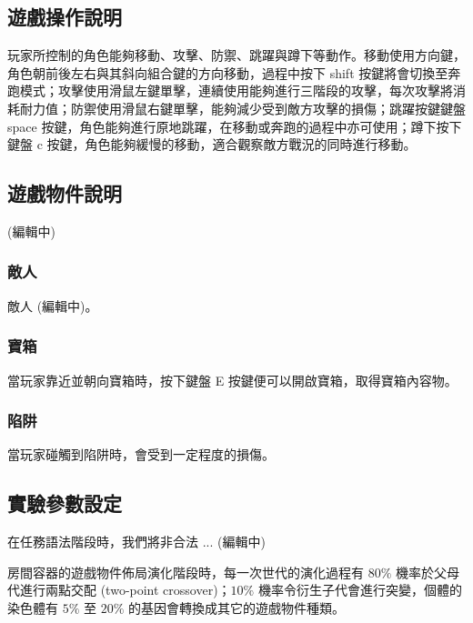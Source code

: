 \subsection{遊戲操作說明}
\label{ssec:experiment-gameplaymanual}

玩家所控制的角色能夠移動、攻擊、防禦、跳躍與蹲下等動作。移動使用方向鍵，角色朝前後左右與其斜向組合鍵的方向移動，過程中按下 shift 按鍵將會切換至奔跑模式；攻擊使用滑鼠左鍵單擊，連續使用能夠進行三階段的攻擊，每次攻擊將消耗耐力值；防禦使用滑鼠右鍵單擊，能夠減少受到敵方攻擊的損傷；跳躍按鍵鍵盤 space 按鍵，角色能夠進行原地跳躍，在移動或奔跑的過程中亦可使用；蹲下按下鍵盤 c 按鍵，角色能夠緩慢的移動，適合觀察敵方戰況的同時進行移動。

\subsection{遊戲物件說明}
\label{ssec:experiment-gameobjects}

(編輯中)

\subsubsection{敵人}
\label{sssec:experiment-gameobjects-enemy}

敵人 (編輯中)。

\subsubsection{寶箱}
\label{sssec:experiment-gameobjects-treasure}

當玩家靠近並朝向寶箱時，按下鍵盤 E 按鍵便可以開啟寶箱，取得寶箱內容物。

\subsubsection{陷阱}
\label{sssec:experiment-gameobjects-trap}

當玩家碰觸到陷阱時，會受到一定程度的損傷。

\subsection{實驗參數設定}
\label{ssec:experiment-parameters}

在任務語法階段時，我們將非合法 ... (編輯中)

房間容器的遊戲物件佈局演化階段時，每一次世代的演化過程有 $80\%$ 機率於父母代進行兩點交配 (two-point crossover)；$10\%$ 機率令衍生子代會進行突變，個體的染色體有 $5\%$ 至 $20\%$ 的基因會轉換成其它的遊戲物件種類。

